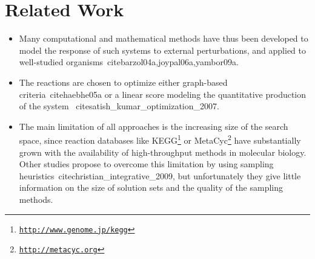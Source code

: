 
\section{Related Work}
\label{sec:related}

\begin{itemize}
\item {}
Many computational and mathematical methods have thus been developed to model the response of such systems
to external perturbations, and applied to well-studied organisms~cite{barzol04a,joypal06a,yambor09a}.
\item  {}
The reactions are chosen to optimize either   graph-based criteria~cite{haebhe05a} or a linear
score modeling the quantitative production of the system~%
cite{satish\_kumar\_optimization\_2007}.
\item  {}
The main limitation of all approaches is the increasing size of the search space, since reaction %
databases 
like 
KEGG\footnote{\texttt{\url{http://www.genome.jp/kegg}}} or MetaCyc\footnote{\texttt{\url{http://metacyc.org}}} %
have substantially grown %
with
the availability of high-throughput methods in molecular biology. 
Other studies propose to overcome this limitation by using sampling
heuristics~cite{christian\_integrative\_2009}, but unfortunately they give little information on the size of
solution sets and the quality of the sampling methods.

\end{itemize}


